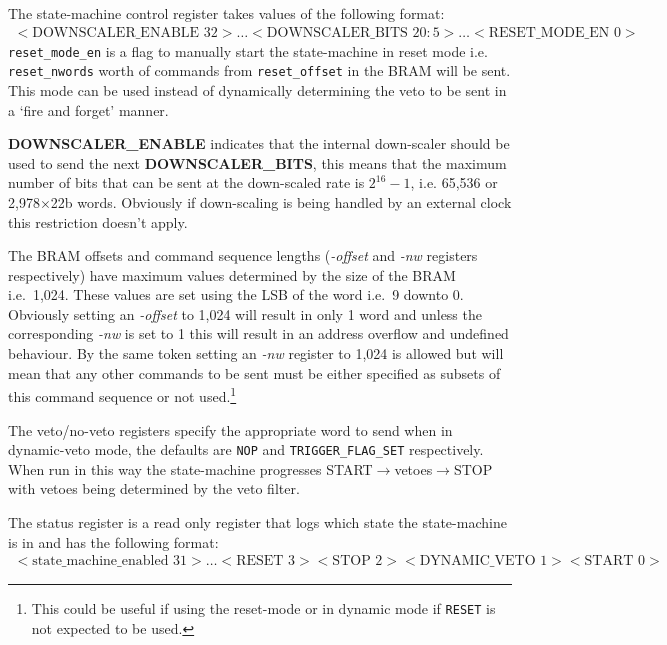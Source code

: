 The state-machine control register takes values of the following format:
\begin{align} \label{fmt:control_reg}
  <\text{DOWNSCALER\_ENABLE } 32>\ldots<\text{DOWNSCALER\_BITS } 20:5>\ldots<\text{RESET\_MODE\_EN } 0>
\end{align}
\texttt{reset\_mode\_en} is a flag to manually start the state-machine in reset mode i.e. \texttt{reset\_nwords} worth of commands from \texttt{reset\_offset} in the BRAM will be sent. This mode can be used instead of dynamically determining the veto to be sent in a `fire and forget' manner.

\textbf{DOWNSCALER\_ENABLE} indicates that the internal down-scaler should be used to send the next \textbf{DOWNSCALER\_BITS}, this means that the maximum number of bits that can be sent at the down-scaled rate is \(2^{16} - 1\), i.e. 65,536 or 2,978\(\times\)22b words. Obviously if down-scaling is being handled by an external clock this restriction doesn't apply.

The BRAM offsets and command sequence lengths (\emph{-offset} and \emph{-nw} registers respectively) have maximum values determined by the size of the BRAM i.e.\ 1,024. These values are set using the LSB of the word i.e.\ 9 downto 0. Obviously setting an \emph{-offset} to 1,024 will result in only 1 word and unless the corresponding \emph{-nw} is set to 1 this will result in an address overflow and undefined behaviour. By the same token setting an \emph{-nw} register to 1,024 is allowed but will mean that any other commands to be sent must be either specified as subsets of this command sequence or not used.\footnote{This could be useful if using the reset-mode or in dynamic mode if \texttt{RESET} is not expected to be used.}
    
The veto/no-veto registers specify the appropriate word to send when in dynamic-veto mode, the defaults are \texttt{NOP} and \texttt{TRIGGER\_FLAG\_SET} respectively. When run in this way the state-machine progresses START\(\rightarrow\)vetoes\(\rightarrow\)STOP with vetoes being determined by the veto filter.
      
The status register is a read only register that logs which state the state-machine is in and has the following format:
\begin{align} \label{fmt:status_reg}
  <\text{state\_machine\_enabled } 31>\ldots<\text{RESET } 3> <\text{STOP } 2> <\text{DYNAMIC\_VETO } 1> <\text{START } 0>
\end{align}
	  
